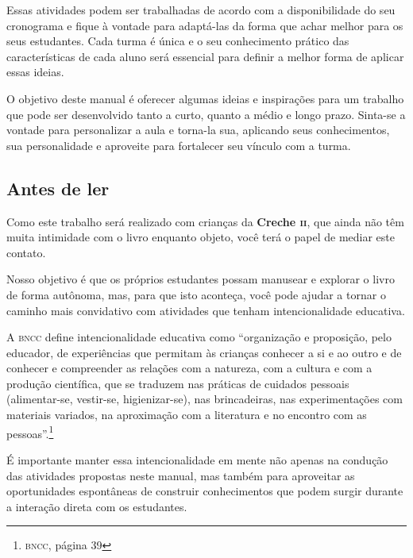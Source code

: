 \documentclass[11pt]{extarticle}
\begin{document}
Essas atividades podem ser trabalhadas de acordo com a 
disponibilidade do seu cronograma e fique à vontade para adaptá-las 
da forma que achar melhor para os seus estudantes. Cada turma é única 
e o seu conhecimento prático das características de cada aluno será 
essencial para definir a melhor forma de aplicar essas ideias. 

O objetivo deste manual é oferecer algumas ideias 
e inspirações para um trabalho que pode ser desenvolvido tanto 
a curto, quanto a médio e longo prazo. Sinta-se a vontade para 
personalizar a aula e torna-la sua, aplicando seus conhecimentos, sua 
personalidade e aproveite para fortalecer 
seu vínculo com a turma.


\subsection{Antes de ler}


Como este trabalho será realizado com crianças da \textbf{Creche \textsc{ii}}, 
que ainda não têm muita intimidade com o livro enquanto objeto, você terá o 
papel de mediar este contato. 

Nosso objetivo é que os próprios estudantes possam manusear 
e explorar o livro de forma autônoma, mas, para que isto aconteça, você 
pode ajudar a tornar o caminho mais convidativo com atividades que tenham 
intencionalidade educativa. 

A \textsc{bncc} define intencionalidade educativa como ``organização 
e proposição, pelo educador, de experiências que permitam às crianças 
conhecer a si e ao outro e de conhecer e compreender as relações com a 
natureza, com a cultura e com a produção científica, que se traduzem nas 
práticas de cuidados pessoais (alimentar-se, vestir-se, higienizar-se), 
nas brincadeiras, nas experimentações com materiais 
variados, na aproximação com a literatura e no encontro com as 
pessoas''.\footnote{\textsc{bncc}, página 39}

É importante manter essa intencionalidade em mente não apenas na condução 
das atividades propostas neste manual, mas também para aproveitar as 
oportunidades espontâneas de construir conhecimentos que podem surgir durante 
a interação direta com os estudantes.
\end{document}
